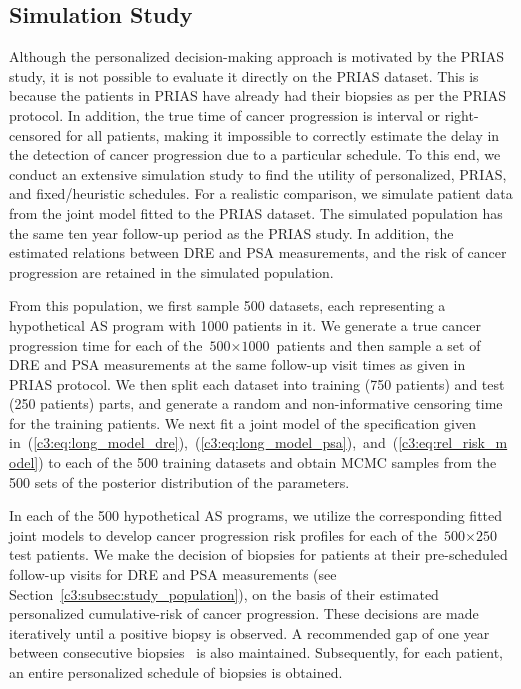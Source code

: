 \subsection{Simulation Study}
\label{c3:subsec:sim_study}
Although the personalized decision-making approach is motivated by the PRIAS study, it is not possible to evaluate it directly on the PRIAS dataset. This is because the patients in PRIAS have already had their biopsies as per the PRIAS protocol. In addition, the true time of cancer progression is interval or right-censored for all patients, making it impossible to correctly estimate the delay in the detection of cancer progression due to a particular schedule. To this end, we conduct an extensive simulation study to find the utility of personalized, PRIAS, and fixed/heuristic schedules. For a realistic comparison, we simulate patient data from the joint model fitted to the PRIAS dataset. The simulated population has the same ten year follow-up period as the PRIAS study. In addition, the estimated relations between DRE and PSA measurements, and the risk of cancer progression are retained in the simulated population.

From this population, we first sample 500 datasets, each representing a hypothetical AS program with 1000 patients in it. We generate a true cancer progression time for each of the ${\mbox{500} \times \mbox{1000}}$ patients and then sample a set of DRE and PSA measurements at the same follow-up visit times as given in PRIAS protocol. We then split each dataset into training (750 patients) and test (250 patients) parts, and generate a random and non-informative censoring time for the training patients. We next fit a joint model of the specification given in~(\ref{c3:eq:long_model_dre}),~(\ref{c3:eq:long_model_psa}),~and~(\ref{c3:eq:rel_risk_model}) to each of the 500 training datasets and obtain MCMC samples from the 500 sets of the posterior distribution of the parameters. 

In each of the 500 hypothetical AS programs, we utilize the corresponding fitted joint models to develop cancer progression risk profiles for each of the ${\mbox{500} \times \mbox{250}}$ test patients. We make the decision of biopsies for patients at their pre-scheduled follow-up visits for DRE and PSA measurements (see Section~\ref{c3:subsec:study_population}), on the basis of their estimated personalized cumulative-risk of cancer progression. These decisions are made iteratively until a positive biopsy is observed. A recommended gap of one year between consecutive biopsies~\citep{bokhorst2015compliance} is also maintained. Subsequently, for each patient, an entire personalized schedule of biopsies is obtained.


